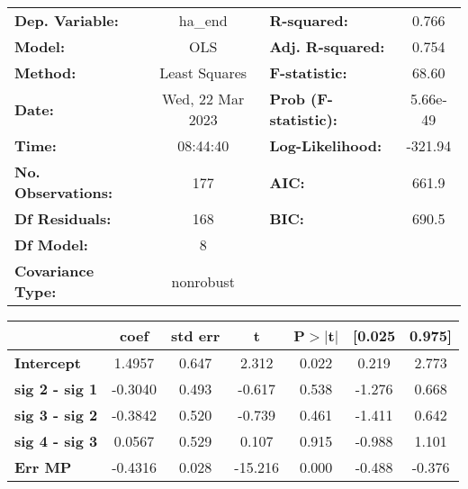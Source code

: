 \begin{center}
\begin{tabular}{lclc}
\toprule
\textbf{Dep. Variable:}    &     ha\_end      & \textbf{  R-squared:         } &    0.766  \\
\textbf{Model:}            &       OLS        & \textbf{  Adj. R-squared:    } &    0.754  \\
\textbf{Method:}           &  Least Squares   & \textbf{  F-statistic:       } &    68.60  \\
\textbf{Date:}             & Wed, 22 Mar 2023 & \textbf{  Prob (F-statistic):} & 5.66e-49  \\
\textbf{Time:}             &     08:44:40     & \textbf{  Log-Likelihood:    } &  -321.94  \\
\textbf{No. Observations:} &         177      & \textbf{  AIC:               } &    661.9  \\
\textbf{Df Residuals:}     &         168      & \textbf{  BIC:               } &    690.5  \\
\textbf{Df Model:}         &           8      & \textbf{                     } &           \\
\textbf{Covariance Type:}  &    nonrobust     & \textbf{                     } &           \\
\bottomrule
\end{tabular}
\end{center}\begin{center}
\begin{tabular}{lcccccc}
\toprule
                                & \textbf{coef} & \textbf{std err} & \textbf{t} & \textbf{P$> |$t$|$} & \textbf{[0.025} & \textbf{0.975]}  \\
\midrule
\textbf{Intercept}              &       1.4957  &        0.647     &     2.312  &         0.022        &        0.219    &        2.773     \\
\textbf{sig 2 - sig 1}          &      -0.3040  &        0.493     &    -0.617  &         0.538        &       -1.276    &        0.668     \\
\textbf{sig 3 - sig 2}          &      -0.3842  &        0.520     &    -0.739  &         0.461        &       -1.411    &        0.642     \\
\textbf{sig 4 - sig 3}          &       0.0567  &        0.529     &     0.107  &         0.915        &       -0.988    &        1.101     \\
\textbf{Err MP}                 &      -0.4316  &        0.028     &   -15.216  &         0.000        &       -0.488    &       -0.376     \\

\end{tabular}
\end{center}
